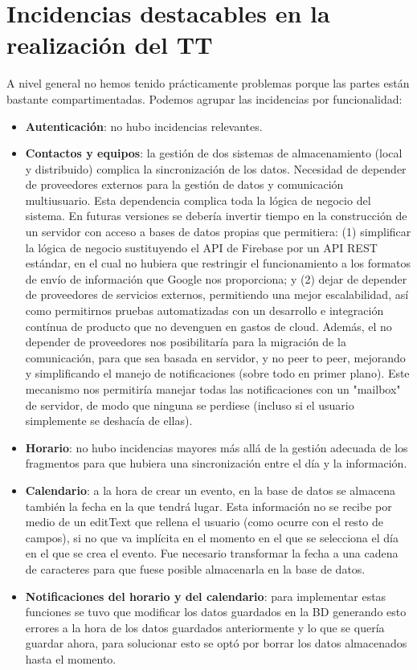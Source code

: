 \documentclass[a4paper,openright,12pt]{article}
\begin{document}
\section{Incidencias destacables en la realización del TT}
A nivel general no hemos tenido prácticamente problemas porque las partes están bastante compartimentadas.
Podemos agrupar las incidencias por funcionalidad:
\begin{itemize}
    \item \textbf{Autenticación}: no hubo incidencias relevantes.
    \item \textbf{Contactos y equipos}: la gestión de dos sistemas de almacenamiento (local y distribuido) complica la sincronización de los datos. Necesidad de depender de proveedores externos para la gestión de datos y comunicación multiusuario. Esta dependencia complica toda la lógica de negocio del sistema. En futuras versiones se debería invertir tiempo en la construcción de un servidor con acceso a bases de datos propias que permitiera: (1) simplificar la lógica de negocio sustituyendo el API de Firebase por un API REST estándar, en el cual no hubiera que restringir el funcionamiento a los formatos de envío de información que Google nos proporciona; y (2) dejar de depender de proveedores de servicios externos, permitiendo una mejor escalabilidad, así como permitirnos pruebas automatizadas con un desarrollo e integración contínua de producto que no devenguen en gastos de cloud. 
    Además, el no depender de proveedores nos posibilitaría para la migración de la comunicación, para que sea basada en servidor, y no peer to peer, mejorando y simplificando el manejo de notificaciones (sobre todo en primer plano). Este mecanismo nos permitiría manejar todas las notificaciones con un "mailbox" de servidor, de modo que ninguna se perdiese (incluso si el usuario simplemente se deshacía de ellas).

    \item \textbf{Horario}: no hubo incidencias mayores más allá de la gestión adecuada de los fragmentos para que hubiera una sincronización entre el día y la información.
    
    \item \textbf{Calendario}: a la hora de crear un evento, en la base de datos se almacena también la fecha en la que tendrá lugar. Esta información no se recibe por medio de un editText que rellena el usuario (como ocurre con el resto de campos), si no que va implícita en el momento en el que se selecciona el día en el que se crea el evento. Fue necesario transformar la fecha a una cadena de caracteres para que fuese posible almacenarla en la base de datos.

    \item \textbf{Notificaciones del horario y del calendario}: para implementar estas funciones se tuvo que modificar los datos guardados en la BD generando esto errores a la hora de los datos guardados anteriormente y lo que se quería guardar ahora, para solucionar esto se optó por borrar los datos almacenados hasta el momento.



\end{itemize}
\end{document}
